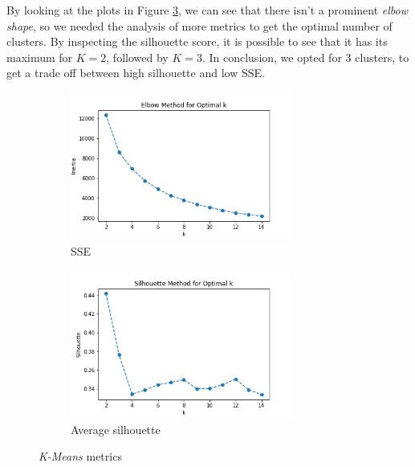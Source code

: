 By looking at the plots in Figure \ref{fig:km_metrics}, we can see that there isn't a prominent \emph{elbow shape}, so we needed the analysis of more metrics to get the optimal number of clusters. By inspecting the silhouette score, it is possible to see that it has its maximum for $K = 2$, followed by $K = 3$. In conclusion, we opted for 3 clusters, to get a trade off between high silhouette and low SSE.

\begin{figure}[h!]
     \vspace{4mm}
     \captionsetup{justification=centering}		
     \centering
     \begin{subfigure}{0.49\textwidth}
         \centering
	 \captionsetup{type=figure}
         \includegraphics[width=0.8\textwidth]{img/clustering/sse.png}
         \caption{SSE}
         \label{fig:sse}
     \end{subfigure}
     \begin{subfigure}{0.49\textwidth}
         \centering
         \includegraphics[width=0.8\textwidth]{img/clustering/sil.png}
         \caption{Average silhouette}
         \label{fig:sil}
     \end{subfigure}
     \caption{\emph{K-Means} metrics}
    \label{fig:km_metrics}
\end{figure}

